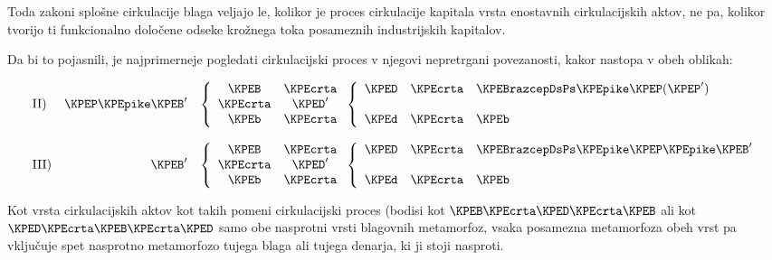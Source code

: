 \documentclass[kapital_02.tex]{subfiles}
\begin{document}
Toda zakoni splošne cirkulacije blaga veljajo le, kolikor je proces cirkulacije kapitala vrsta enostavnih cirkulacijskih aktov, ne pa, kolikor tvorijo ti funkcionalno določene odseke krožnega toka posameznih industrijskih kapitalov.

Da bi to pojasnili, je najprimerneje pogledati cirkulacijski proces v njegovi nepretrgani povezanosti, kakor nastopa v obeh oblikah:

\[
    \begin{array}{l r l}
        \textrm{II)} & \KPEP \KPEpike \KPEB' & \left\lbrace
        \begin{array}{c c}
            \KPEB & \KPEcrta \\
            \KPEcrta & \KPED' \\
            \KPEb & \KPEcrta \\
        \end{array}
        \right.
        \left\lbrace
        \begin{array}{c c l}
            \KPED & \KPEcrta & \KPEBrazcepDsPs \KPEpike \KPEP (\KPEP') \\
             & & \\
            \KPEd & \KPEcrta & \KPEb \\
        \end{array}
        \right. \\
         & & \\
        \textrm{III)} & \KPEB' & \left\lbrace
        \begin{array}{c c}
            \KPEB & \KPEcrta \\
            \KPEcrta & \KPED' \\
            \KPEb & \KPEcrta \\
        \end{array}
        \right.
        \left\lbrace
        \begin{array}{c c l}
            \KPED & \KPEcrta & \KPEBrazcepDsPs \KPEpike \KPEP \KPEpike \KPEB' \\
             & & \\
            \KPEd & \KPEcrta & \KPEb \\
        \end{array}
        \right. \\
    \end{array}
\]

Kot vrsta cirkulacijskih aktov kot takih pomeni cirkulacijski proces (bodisi kot \( \KPEB \KPEcrta \KPED \KPEcrta \KPEB \) ali kot \( \KPED \KPEcrta \KPEB \KPEcrta \KPED \) samo obe nasprotni vrsti blagovnih metamorfoz, vsaka posamezna \KPEstran metamorfoza obeh vrst pa vključuje spet nasprotno metamorfozo tujega blaga ali tujega denarja, ki ji stoji nasproti.
\end{document}
